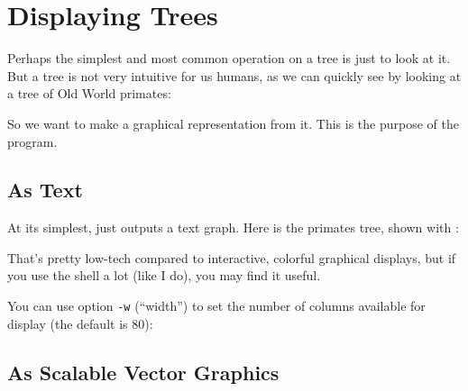 
\section{Displaying Trees}
\label{sct_display}

Perhaps the simplest and most common operation on a \nw{} tree is just to look
at it. But a \nw{} tree is not very intuitive for us humans, as we can quickly
see by looking \eg{} at a tree of Old World primates:


\begin{samepage}

\end{samepage}

\noindent{}So we want to make a graphical representation from it. This is the purpose of
the \display{} program. 

\subsection{As Text}
\label{sct_display_text}

At its simplest, \display{} just outputs a text graph. Here is the primates tree, shown with \display{}:

\begin{samepage}

\end{samepage}
That's pretty low-tech compared to interactive, colorful graphical displays,
but if you use the shell a lot (like I do), you may find it useful.

You can use option \texttt{-w} (``width'') to set the number of columns
available for display (the default is 80):


\begin{samepage}

\end{samepage}

\subsection[As SVG]{As Scalable Vector Graphics}
\label{sct_display_svg}


